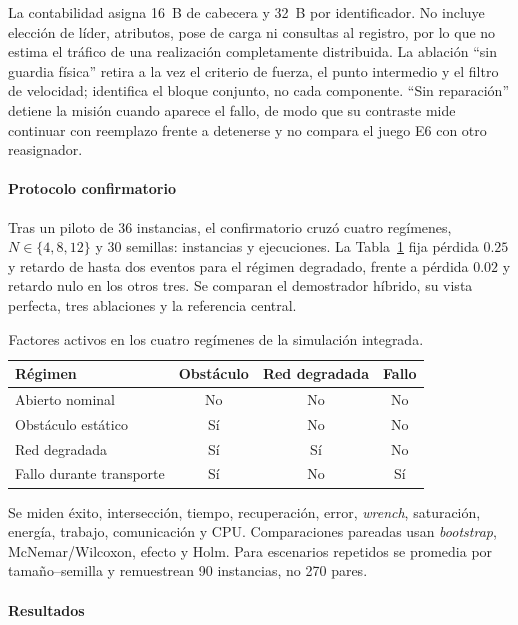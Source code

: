 La contabilidad asigna 16~B de cabecera y 32~B por identificador. No incluye elección de líder, atributos, pose de carga ni consultas al registro, por lo que no estima el tráfico de una realización completamente distribuida. La ablación ``sin guardia física'' retira a la vez el criterio de fuerza, el punto intermedio y el filtro de velocidad; identifica el bloque conjunto, no cada componente. ``Sin reparación'' detiene la misión cuando aparece el fallo, de modo que su contraste mide continuar con reemplazo frente a detenerse y no compara el juego E6 con otro reasignador.

\paragraph{Protocolo confirmatorio}

Tras un piloto de 36 instancias, el confirmatorio cruzó cuatro regímenes, $N\in\{4,8,12\}$ y 30 semillas: \CargoEtwoEWorlds{} instancias y \CargoEtwoERuns{} ejecuciones. La Tabla~\ref{tab:cargo-e2e-regimes} fija pérdida $0.25$ y retardo de hasta dos eventos para el régimen degradado, frente a pérdida $0.02$ y retardo nulo en los otros tres. Se comparan el demostrador híbrido, su vista perfecta, tres ablaciones y la referencia central.

\begin{table}[!htbp]
  \centering
  \caption{Factores activos en los cuatro regímenes de la simulación integrada.}
  \label{tab:cargo-e2e-regimes}
  \small
  \begin{tabular}{lccc}
    \toprule
    Régimen & Obstáculo & Red degradada & Fallo \\
    \midrule
    Abierto nominal & No & No & No \\
    Obstáculo estático & Sí & No & No \\
    Red degradada & Sí & Sí & No \\
    Fallo durante transporte & Sí & No & Sí \\
    \bottomrule
  \end{tabular}
  \viuownsource
\end{table}

Se miden éxito, intersección, tiempo, recuperación, error, \emph{wrench}, saturación, energía, trabajo, comunicación y CPU. Comparaciones pareadas usan \emph{bootstrap}, McNemar/Wilcoxon, efecto y Holm. Para escenarios repetidos se promedia por tamaño--semilla y remuestrean 90 instancias, no 270 pares.

\paragraph{Resultados}

